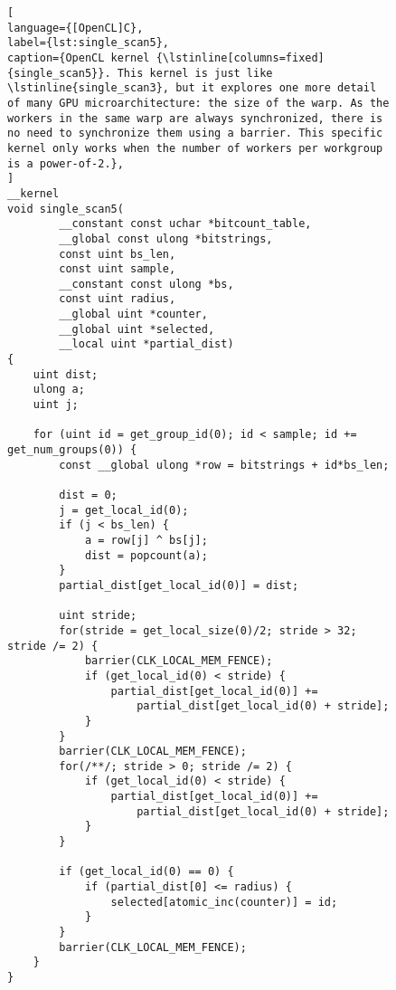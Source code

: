 \begin{figure}[!p]
\begin{lstlisting}[
language={[OpenCL]C},
label={lst:single_scan5},
caption={OpenCL kernel {\lstinline[columns=fixed]{single_scan5}}. This kernel is just like \lstinline{single_scan3}, but it explores one more detail of many GPU microarchitecture: the size of the warp. As the workers in the same warp are always synchronized, there is no need to synchronize them using a barrier. This specific kernel only works when the number of workers per workgroup is a power-of-2.},
]
__kernel
void single_scan5(
        __constant const uchar *bitcount_table,
        __global const ulong *bitstrings,
        const uint bs_len,
        const uint sample,
        __constant const ulong *bs,
        const uint radius,
        __global uint *counter,
        __global uint *selected,
        __local uint *partial_dist)
{
    uint dist;
    ulong a;
    uint j;

    for (uint id = get_group_id(0); id < sample; id += get_num_groups(0)) {
        const __global ulong *row = bitstrings + id*bs_len;

        dist = 0;
        j = get_local_id(0);
        if (j < bs_len) {
            a = row[j] ^ bs[j];
            dist = popcount(a);
        }
        partial_dist[get_local_id(0)] = dist;

        uint stride;
        for(stride = get_local_size(0)/2; stride > 32; stride /= 2) {
            barrier(CLK_LOCAL_MEM_FENCE);
            if (get_local_id(0) < stride) {
                partial_dist[get_local_id(0)] +=
                    partial_dist[get_local_id(0) + stride];
            }
        }
        barrier(CLK_LOCAL_MEM_FENCE);
        for(/**/; stride > 0; stride /= 2) {
            if (get_local_id(0) < stride) {
                partial_dist[get_local_id(0)] +=
                    partial_dist[get_local_id(0) + stride];
            }
        }

        if (get_local_id(0) == 0) {
            if (partial_dist[0] <= radius) {
                selected[atomic_inc(counter)] = id;
            }
        }
        barrier(CLK_LOCAL_MEM_FENCE);
    }
}
\end{lstlisting}
\end{figure}

